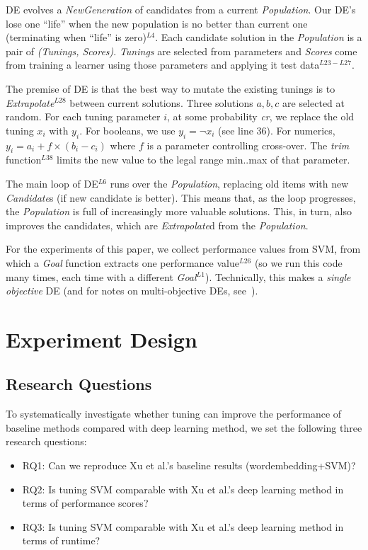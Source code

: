 \documentclass[sigconf,review, anonymous]{acmart}
\theoremstyle{break}
\newcommand{\bi}{\begin{itemize}[leftmargin=0.4cm]}
\newcommand{\ei}{\end{itemize}}
\begin{document}
DE evolves a {\em NewGeneration} of candidates  from
a current {\em Population}.  Our DE's lose one ``life''
when the new population is no better than  current one (terminating when ``life'' is zero)$^{L4}$.
Each candidate solution in the {\em Population}  
is a pair of {\em (Tunings, Scores)}.  {\em Tunings} are selected from
{parameters} and {\em Scores} come from training a learner using those parameters
and applying it     test data$^{L23-L27}$.

The premise of DE  is that the best way to mutate the existing tunings
is to {\em Extrapolate}$^{L28}$
between current solutions.  Three solutions $a,b,c$ are selected at random.
For each tuning parameter $i$, at some probability {\em cr}, we replace
the old tuning $x_i$ with $y_i$. For booleans, we use $y_i= \neg x_i$ (see line 36). For numerics, $y_i = a_i+f \times (b_i - c_i)$   where $f$ is a parameter
controlling  cross-over.  The {\em trim} function$^{L38}$ limits the new
value to the legal range min..max of that parameter.
 
The main loop of DE$^{L6}$ runs over the {\em Population}, replacing old items
with new {\em Candidate}s (if  new candidate is better).
This means that, as the loop progresses, the {\em Population} is full of increasingly
more valuable solutions. This, in turn, also improves  the candidates, which are {\em Extrapolate}d
from the {\em Population}.

For the experiments of this paper, we collect performance
values from SVM, from which a {\em Goal} function extracts one 
performance value$^{L26}$ (so we run this code many times, each time with
a different {\em Goal}$^{L1}$).  Technically, this makes a  {\em single objective} DE 
(and for notes on multi-objective DEs, see~\cite{robivc2005demo,zhang2007moea,huang2010differential}).


\section{Experiment Design}
\subsection{Research Questions}\label{RQ}
 To systematically investigate whether tuning can improve the 
 performance of baseline methods compared with deep learning method, we set
 the following three research questions:
 
 \bi
 \item RQ1: Can we reproduce Xu et al.'s baseline results (wordembedding+SVM)?
 \item RQ2: Is tuning SVM comparable with Xu et al.'s deep learning method in terms of performance scores?
 \item RQ3: Is tuning SVM comparable with Xu et al.'s deep learning method in terms of runtime?
 \ei
 
\end{document}
